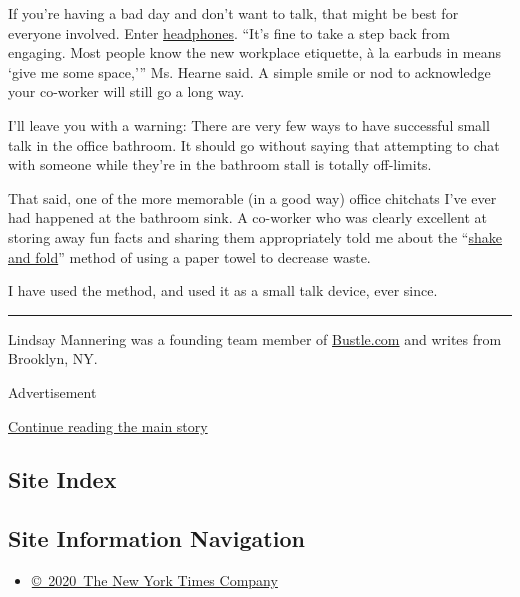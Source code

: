 If you're having a bad day and don't want to talk, that might be best
for everyone involved. Enter
\href{https://www.nytimes.com/2015/12/24/fashion/headphones-now-playing-nothing.html}{headphones}.
``It's fine to take a step back from engaging. Most people know the new
workplace etiquette, à la earbuds in means `give me some space,''' Ms.
Hearne said. A simple smile or nod to acknowledge your co-worker will
still go a long way.

I'll leave you with a warning: There are very few ways to have
successful small talk in the office bathroom. It should go without
saying that attempting to chat with someone while they're in the
bathroom stall is totally off-limits.

That said, one of the more memorable (in a good way) office chitchats
I've ever had happened at the bathroom sink. A co-worker who was clearly
excellent at storing away fun facts and sharing them appropriately told
me about the ``\href{http://shakeandfold.org/}{shake and fold}'' method
of using a paper towel to decrease waste.

I have used the method, and used it as a small talk device, ever since.

\begin{center}\rule{0.5\linewidth}{\linethickness}\end{center}

Lindsay Mannering was a founding team member of
\href{https://www.bustle.com/}{Bustle.com} and writes from Brooklyn, NY.

Advertisement

\protect\hyperlink{after-bottom}{Continue reading the main story}

\hypertarget{site-index}{%
\subsection{Site Index}\label{site-index}}

\hypertarget{site-information-navigation}{%
\subsection{Site Information
Navigation}\label{site-information-navigation}}

\begin{itemize}
\tightlist
\item
  \href{https://help.nytimes.com/hc/en-us/articles/115014792127-Copyright-notice}{©~2020~The
  New York Times Company}
\end{itemize}

